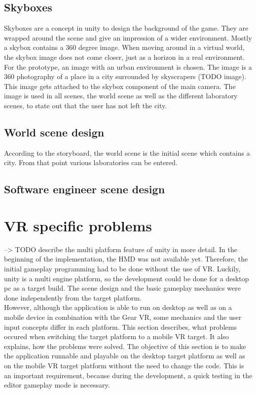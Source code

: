 \subsection{Skyboxes}
Skyboxes are a concept in unity to design the background of the game. They are wrapped around the scene and give an impression of a wider environment. Mostly a skybox contains a 360 degree image. When moving around in a virtual world, the skybox image does not come closer, just as a horizon in a real environment.\\
For the prototype, an image with an urban environment is chosen. The image is a 360 photography of a place in a city surrounded by skyscrapers (TODO image). This image gets attached to the skybox component of the main camera. The image is used in all scenes, the world scene as well as the different laboratory scenes, to state out that the user has not left the city.
\subsection{World scene design}
According to the storyboard, the world scene is the initial scene which contains a city. From that point various laboratories can be entered.

\subsection{Software engineer scene design}
\section{VR specific problems}
--> TODO describe the multi platform feature of unity in more detail.
In the beginning of the implementation, the HMD was not available yet. Therefore, the initial gameplay programming had to be done without the use of VR. Luckily, unity is a multi engine platform, so the development could be done for a desktop pc as a target build. The scene design and the basic gameplay mechanics were done independently from the target platform. \\
However, although the application is able to run on desktop as well as on a mobile device in combination with the Gear VR, some mechanics and the user input concepts differ in each platform. This section describes, what problems occured when switching the target platform to a mobile VR target. It also explains, how the problems were solved. The objective of this section is to make the application runnable and playable on the desktop target platform as well as on the mobile VR target platform without the need to change the code. This is an important requirement, because during the development, a quick testing in the editor gameplay mode is necessary. 
